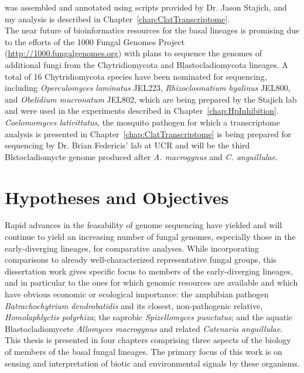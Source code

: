 was assembled and annotated using scripts provided by Dr. Jason
Stajich, and my analysis is described in
Chapter~\ref{chap:ClatTranscriptome}.\\
\indent The near future of bioinformatics resources for the basal
lineages is promising due to the efforts of the 1000 Fungal Genomes
Project (\url{http://1000.fungalgenomes.org}) with plans to sequence the 
genomes of additional fungi from the Chytridiomycota and Blastocladiomycota 
lineages. A total of 16 Chytridiomycota species have been nominated for 
sequencing, including \textit{Operculomyces laminatus} JEL223, 
\textit{Rhizoclosmatium hyalinus} JEL800, and \textit{Obelidium mucronatum} JEL802, 
which are being prepared by the Stajich lab and were used in the experiments 
described in Chapter~\ref{chap:HpInhibition}. \textit{Coelomomyces lativittatus}, 
the mosquito pathogen for which a transcriptome analysis is presented in 
Chapter~\ref{chap:ClatTranscriptome} is being prepared for sequencing by 
Dr. Brian Federicis' lab at UCR and will be the third Blstocladiomycte genome
produced after \textit{A. macrogynus} and \textit{C. anguillulae}.\\

\section{Hypotheses and Objectives}
\indent Rapid advances in the feasability of genome sequencing have
yielded and will continue to yield an increasing number of fungal
genomes, especially those in the early-diverging lineages, for
comparative analyses. While incorporating comparisons to already
well-characterized representative fungal groups, this dissertation
work gives specific focus to members of the early-diverging lineages,
and in particular to the ones for which genomic resources are
available and which have obvious economic or ecological importance:
the amphibian pathogen \textit{Batrachochytrium dendrobatidis} and its
closest, non-pathogenic relative, \textit{Homolaphlyctis polyrhiza};
the saprobic \textit{Spizellomyces punctatus}; and the aquatic
Blastocladiomycete \textit{Allomyces macrogynus} and related
\textit{Catenaria anguillulae}. This thesis is presented in four
chapters comprising three aspects of the biology of members of
the basal fungal lineages. The primary focus of this work
is on sensing and interpretation of biotic and environmental signals
by these organisms.\\

